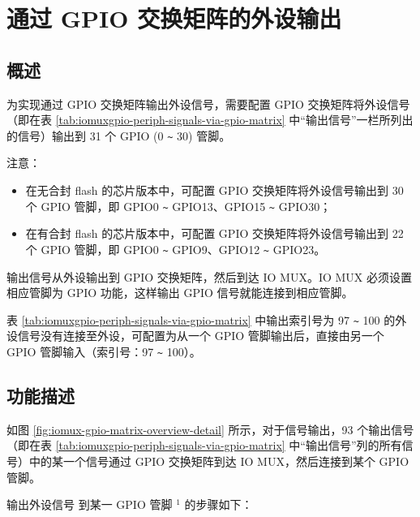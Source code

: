 \documentclass[main\_\_CN.tex]{subfiles}
\begin{document}
\section{通过 GPIO 交换矩阵的外设输出}
\label{sec:peripheral-output-via-gpio-matrix}

\subsection{概述}

为实现通过 GPIO 交换矩阵输出外设信号，需要配置 GPIO 交换矩阵将外设信号（即在表 \ref{tab:iomuxgpio-periph-signals-via-gpio-matrix} 中“输出信号”一栏所列出的信号）输出到 31 个 GPIO (0 \verb+~+ 30) 管脚。

注意：
\begin{itemize}
    \item 在无合封 flash 的芯片版本中，可配置 GPIO 交换矩阵将外设信号输出到 30 个 GPIO 管脚，即 GPIO0 \verb+~+ GPIO13、GPIO15 \verb+~+ GPIO30；
    \item 在有合封 flash 的芯片版本中，可配置 GPIO 交换矩阵将外设信号输出到 22 个 GPIO 管脚，即 GPIO0 \verb+~+ GPIO9、GPIO12 \verb+~+ GPIO23。
\end{itemize}

输出信号从外设输出到 GPIO 交换矩阵，然后到达 IO MUX。IO MUX 必须设置相应管脚为 GPIO 功能，这样输出 GPIO 信号就能连接到相应管脚。

\begin{tiplisting}
表 \ref{tab:iomuxgpio-periph-signals-via-gpio-matrix} 中输出索引号为 97 \verb+~+ 100 的外设信号没有连接至外设，可配置为从一个 GPIO 管脚输出后，直接由另一个 GPIO 管脚输入（索引号：97 \verb+~+ 100）。
\end{tiplisting}
\vspace{-2em}


\subsection{功能描述}\label{IOMUXPeripheralOutput}

如图 \ref{fig:iomux-gpio-matrix-overview-detail} 所示，对于信号输出，93 个输出信号（即在表 \ref{tab:iomuxgpio-periph-signals-via-gpio-matrix} 中“输出信号”列的所有信号）中的某一个信号通过 GPIO 交换矩阵到达 IO MUX，然后连接到某个 GPIO 管脚。

输出外设信号  到某一 GPIO 管脚 \hyperref[output-note-1]{$^1$} 的步骤如下：
\end{document}
